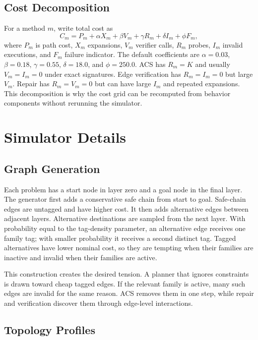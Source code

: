 \documentclass{article}
\newcommand{\ACS}{\textsc{ACS}}
\begin{document}
\subsection{Cost Decomposition}

For a method $m$, write total cost as
\[
C_m = P_m + \alpha X_m + \beta V_m + \gamma R_m + \delta I_m + \phi F_m,
\]
where $P_m$ is path cost, $X_m$ expansions, $V_m$ verifier calls, $R_m$ probes, $I_m$ invalid executions, and $F_m$ failure indicator. The default coefficients are $\alpha=0.03$, $\beta=0.18$, $\gamma=0.55$, $\delta=18.0$, and $\phi=250.0$. \ACS{} has $R_m=K$ and usually $V_m=I_m=0$ under exact signatures. Edge verification has $R_m=I_m=0$ but large $V_m$. Repair has $R_m=V_m=0$ but can have large $I_m$ and repeated expansions. This decomposition is why the cost grid can be recomputed from behavior components without rerunning the simulator.

\section{Simulator Details}

\subsection{Graph Generation}

Each problem has a start node in layer zero and a goal node in the final layer. The generator first adds a conservative safe chain from start to goal. Safe-chain edges are untagged and have higher cost. It then adds alternative edges between adjacent layers. Alternative destinations are sampled from the next layer. With probability equal to the tag-density parameter, an alternative edge receives one family tag; with smaller probability it receives a second distinct tag. Tagged alternatives have lower nominal cost, so they are tempting when their families are inactive and invalid when their families are active.

This construction creates the desired tension. A planner that ignores constraints is drawn toward cheap tagged edges. If the relevant family is active, many such edges are invalid for the same reason. \ACS{} removes them in one step, while repair and verification discover them through edge-level interactions.

\subsection{Topology Profiles}
\end{document}
